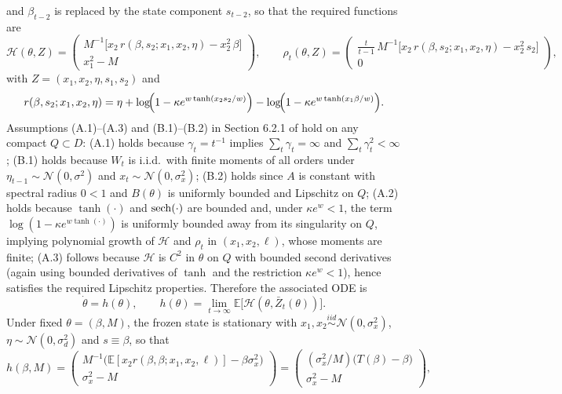 \documentclass[11pt]{article}
\begin{document}
and $\beta_{t-2}$ is replaced by the state component $s_{t-2}$, so that the required functions are
\[
\mathcal H(\theta,Z)=
\begin{pmatrix}
M^{-1}\big[x_{2}\,r(\beta,s_{2};x_1,x_2,\eta)-x_2^2\,\beta\big]\\
x_1^2-M
\end{pmatrix},
\qquad
\rho_t(\theta,Z)=
\begin{pmatrix}
\frac{t}{t-1}\,M^{-1}\big[x_{2}\,r(\beta,s_{2};x_1,x_2,\eta)-x_2^2\,s_{2}\big]\\
0
\end{pmatrix},
\]
with $Z=(x_1,x_2,\eta,s_1, s_2)$ and
\[
r(\beta,s_2;x_1,x_2,\eta)
=\eta+\log\!\Bigl(1-\kappa e^{w\tanh(x_2 s_2/w)}\Bigr)-\log\!\Bigl(1-\kappa e^{w\tanh(x_1 \beta/w)}\Bigr).
\]
Assumptions (A.1)–(A.3) and (B.1)–(B.2) in Section 6.2.1 of \cite{GeorgeWEvans2001} hold on any compact $Q\subset D$: (A.1) holds because $\gamma_t=t^{-1}$ implies $\sum_t\gamma_t=\infty$ and $\sum_t\gamma_t^2<\infty$; 
(B.1) holds because $W_t$ is i.i.d.\ with finite moments of all orders under $\eta_{t-1}\sim\mathcal N(0,\sigma^2)$ and $x_t\sim \mathcal N(0,\sigma_x^2)$; (B.2) holds since $A$ is constant with spectral radius $0<1$ and $B(\theta)$ is uniformly bounded and Lipschitz on $Q$; (A.2) holds because $\tanh(\cdot)$ and $\operatorname*{sech}(\cdot)$ are bounded and, under $\kappa e^{w}<1$, the term $\log(1-\kappa e^{w\tanh(\cdot)})$ is uniformly bounded away from its singularity on $Q$, implying polynomial growth of $\mathcal H$ and $\rho_t$ in $(x_1,x_2,\ell)$, whose moments are finite; (A.3) follows because $\mathcal H$ is $C^2$ in $\theta$ on $Q$ with bounded second derivatives (again using bounded derivatives of $\tanh$ and the restriction $\kappa e^{w}<1$), hence satisfies the required Lipschitz properties. Therefore the associated ODE is
\[
\dot\theta = h(\theta),\qquad h(\theta)=\lim_{t\to\infty}\mathbb E\big[\mathcal H(\theta,\bar Z_t(\theta))\big].
\]
Under fixed $\theta=(\beta,M)$, the frozen state is stationary with $x_1,x_2\stackrel{iid}{\sim}\mathcal N(0,\sigma_x^2)$, $\eta\sim\mathcal N(0,\sigma_d^2)$ and $s\equiv \beta$, so that
\[
h(\beta,M)=
\begin{pmatrix}
M^{-1}\big(\mathbb E[x_2 r(\beta,\beta;x_1,x_2,\ell)]-\beta\sigma_x^2\big)\\
\sigma_x^2-M
\end{pmatrix}
=
\begin{pmatrix}
(\sigma_x^2/M)\big(T(\beta)-\beta\big)\\
\sigma_x^2-M
\end{pmatrix},
\]
\end{document}
